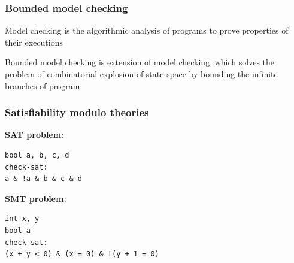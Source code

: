 
\begin{frame}
	\frametitle{Bounded model checking}
	
	\begin{block}{}
	\centering
	Model checking is the algorithmic analysis of programs to prove properties
of their executions
	\end{block}
		
	\begin{block}{}
	\centering
	Bounded model checking is extension of model checking, which solves the problem of combinatorial explosion of state space by bounding the infinite branches of program
	\end{block}
		
\end{frame}



\begin{frame}[fragile]
	\frametitle{Satisfiability modulo theories}
	
	\textbf{SAT problem}:
	\begin{lstlisting}[style=crs_cpp, basicstyle = {\ttfamily \scriptsize},]
bool a, b, c, d
check-sat:
a & !a & b & c & d
	\end{lstlisting}
	
	\textbf{SMT problem}:
	\begin{lstlisting}[style=crs_cpp, basicstyle = {\ttfamily \scriptsize},]
int x, y
bool a
check-sat:
(x + y < 0) & (x = 0) & !(y + 1 = 0)
	\end{lstlisting}
			
\end{frame}



